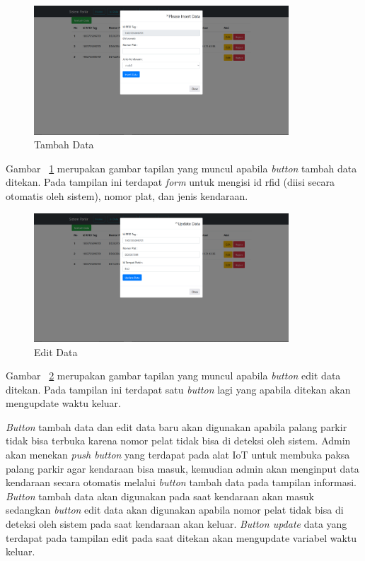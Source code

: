 \begin{figure} [H]
    \includegraphics[width=0.85\textwidth, center]{images/web 5 tambah data.png}
    \caption{Tambah Data}
    \label{fig:web5tambahdata}
\end{figure}

Gambar ~\ref{fig:web5tambahdata} merupakan gambar tapilan yang muncul apabila \textit{button} tambah data ditekan. Pada tampilan ini terdapat \textit{form} untuk mengisi id rfid (diisi secara otomatis oleh sistem), nomor plat, dan jenis kendaraan.

\begin{figure} [H]
    \includegraphics[width=0.85\textwidth, center]{images/web 5 edit data.png}
    \caption{Edit Data}
    \label{fig:web5editdata}
\end{figure}

Gambar ~\ref{fig:web5editdata} merupakan gambar tapilan yang muncul apabila \textit{button} edit data ditekan. Pada tampilan ini terdapat satu \textit{button} lagi yang apabila ditekan akan mengupdate waktu keluar.

\textit{Button} tambah data dan edit data baru akan digunakan apabila palang parkir tidak bisa terbuka karena nomor pelat tidak bisa di deteksi oleh sistem. Admin akan menekan \textit{push button} yang terdapat pada alat IoT untuk membuka paksa palang parkir agar kendaraan bisa masuk, kemudian admin akan menginput data kendaraan secara otomatis melalui \textit{button} tambah data pada tampilan informasi. \textit{Button} tambah data akan digunakan pada saat kendaraan akan masuk sedangkan \textit{button} edit data akan digunakan apabila nomor pelat tidak bisa di deteksi oleh sistem pada saat kendaraan akan keluar. \textit{Button update} data yang terdapat pada tampilan edit pada saat ditekan akan mengupdate variabel waktu keluar.